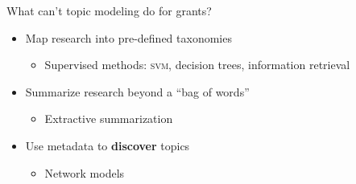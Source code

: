\begin{frame}{What can't topic modeling do for grants?}
  \begin{itemize}
    \item Map research into pre-defined taxonomies 
      \begin{itemize}
        \item Supervised methods: \textsc{svm}, decision trees, information retrieval
      \end{itemize}
    \item Summarize research beyond a ``bag of words''
      \begin{itemize}
        \item Extractive summarization
      \end{itemize}      
    \item Use metadata to {\bf discover} topics 
      \begin{itemize}
        \item Network models
      \end{itemize}
  \end{itemize}
\end{frame}
